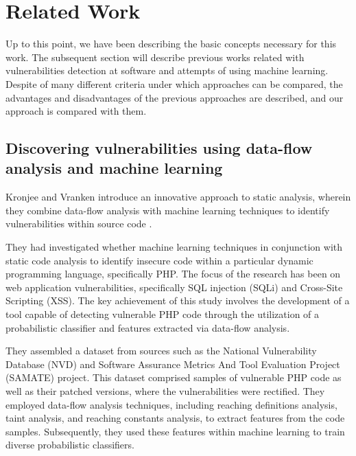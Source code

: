 % 
%  
%

\chapter{Related Work}
\label{cha:relatedwork_chapter}


Up to this point, we have been describing the basic concepts necessary for this work. The subsequent section will describe previous works related with vulnerabilities detection at software and attempts of using machine learning. Despite of many different criteria under which approaches can be compared, the advantages and disadvantages of the previous approaches are described, and our approach is compared with them.


\section{Discovering vulnerabilities using data-flow analysis and machine learning} %
\label{sec:	Discovering_vulnerabilities_using_data_flow_analysis_and_machine_learning}


Kronjee and Vranken introduce an innovative approach to static analysis, wherein they combine data-flow analysis with machine learning techniques to identify vulnerabilities within source code \cite{Kronjee2018}.

They had investigated whether machine learning techniques in conjunction with static code analysis to identify insecure code within a particular dynamic programming language, specifically PHP. The focus of the research has been on web application vulnerabilities, specifically SQL injection (SQLi) and Cross-Site Scripting (XSS). The key achievement of this study involves the development of a tool capable of detecting vulnerable PHP code through the utilization of a probabilistic classifier and features extracted via data-flow analysis.

They assembled a dataset from sources such as the National Vulnerability Database (NVD) \cite{NVD2023} and Software Assurance Metrics And Tool Evaluation Project (SAMATE) \cite{SAMATE2023} project. This dataset comprised samples of vulnerable PHP code as well as their patched versions, where the vulnerabilities were rectified. They employed data-flow analysis techniques, including reaching definitions analysis, taint analysis, and reaching constants analysis, to extract features from the code samples. Subsequently, they used these features within machine learning to train diverse probabilistic classifiers.

